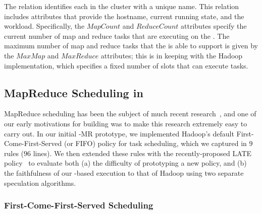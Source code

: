 The  relation identifies each {\TT} in the cluster with a
unique name.  This relation includes attributes that provide the hostname,
current running state, and the \TT workload.  Specifically, the $MapCount$ and
$ReduceCount$ attributes specify the current number of map and reduce tasks
that are executing on the \TT.  The maximum number of map and reduce tasks that
the \TT is able to support is given by the $MaxMap$ and $MaxReduce$ attributes;
this is in keeping with the Hadoop implementation, which specifies a fixed
number of slots that can execute tasks.


\subsection{MapReduce Scheduling in \OVERLOG}
\label{ch:boom:sec:scheduler}

MapReduce scheduling has been the subject of much recent
research~\cite{delay-sched, zaharia-late, hadoopdb, asterix, aster, greenplum},
and one of our early motivations for building \BOOMA was to make this research
extremely easy to carry out.  In our initial \BOOM-MR prototype, we implemented
Hadoop's default First-Come-First-Served (or FIFO) policy for task scheduling,
which we captured in $9$ rules ($96$ lines).  We then extended these rules with
the recently-proposed LATE policy~\cite{zaharia-late} to evaluate both (a) the
difficulty of prototyping a new policy, and (b) the faithfulness of our
\OVERLOG-based execution to that of Hadoop using two separate speculation
algorithms.

\subsubsection{First-Come-First-Served Scheduling}
\label{ch:boom:sec:fifo}

